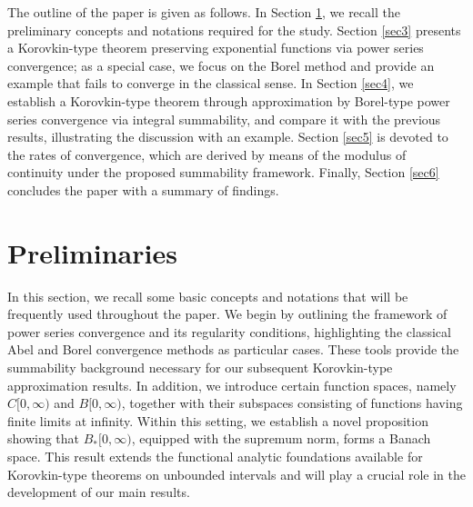 \documentclass{amsart}
\theoremstyle{plain}
\numberwithin{equation}{section}
\begin{document}
The outline of the paper is given as follows. In Section \ref{sec2}, we recall the preliminary concepts and notations required for the study. Section \ref{sec3} presents a Korovkin-type theorem preserving exponential functions via power series convergence; as a special case, we focus on the Borel method and provide an example that fails to converge in the classical sense. In Section \ref{sec4}, we establish a Korovkin-type theorem through approximation by Borel-type power series convergence via integral summability, and compare it with the previous results, illustrating the discussion with an example. Section \ref{sec5} is devoted to the rates of convergence, which are derived by means of the modulus of continuity under the proposed summability framework. Finally, Section \ref{sec6} concludes the paper with a summary of findings.


\section{Preliminaries}\label{sec2}
In this section, we recall some basic concepts and notations that will be frequently used throughout the paper. We begin by outlining the framework of power series convergence and its regularity conditions, highlighting the classical Abel and Borel convergence methods as particular cases. These tools provide the summability background necessary for our subsequent Korovkin-type approximation results. In addition, we introduce certain function spaces, namely $C[0,\infty)$ and $B[0,\infty)$, together with their subspaces consisting of functions having finite limits at infinity. Within this setting, we establish a novel proposition showing that $B_{\ast}[0,\infty)$, equipped with the supremum norm, forms a Banach space. This result extends the functional analytic foundations available for Korovkin-type theorems on unbounded intervals and will play a crucial role in the development of our main results.
\end{document}
